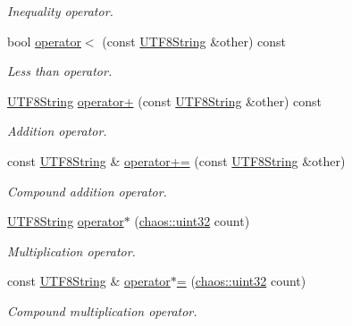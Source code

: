 \begin{DoxyCompactItemize}
\begin{DoxyCompactList}\small\item\em Inequality operator. \end{DoxyCompactList}\item 
bool \hyperlink{classchaos_1_1str_1_1_u_t_f8_string_ac7b54ed9c42a9c9a0a386d453d2c1daa}{operator$<$} (const \hyperlink{classchaos_1_1str_1_1_u_t_f8_string}{U\+T\+F8\+String} \&other) const 
\begin{DoxyCompactList}\small\item\em Less than operator. \end{DoxyCompactList}\item 
\hyperlink{classchaos_1_1str_1_1_u_t_f8_string}{U\+T\+F8\+String} \hyperlink{classchaos_1_1str_1_1_u_t_f8_string_a0d624a8e308b9a04511d31558ae37d8d}{operator+} (const \hyperlink{classchaos_1_1str_1_1_u_t_f8_string}{U\+T\+F8\+String} \&other) const 
\begin{DoxyCompactList}\small\item\em Addition operator. \end{DoxyCompactList}\item 
const \hyperlink{classchaos_1_1str_1_1_u_t_f8_string}{U\+T\+F8\+String} \& \hyperlink{classchaos_1_1str_1_1_u_t_f8_string_a9ce7f005abc581590ff3823db749873f}{operator+=} (const \hyperlink{classchaos_1_1str_1_1_u_t_f8_string}{U\+T\+F8\+String} \&other)
\begin{DoxyCompactList}\small\item\em Compound addition operator. \end{DoxyCompactList}\item 
\hyperlink{classchaos_1_1str_1_1_u_t_f8_string}{U\+T\+F8\+String} \hyperlink{classchaos_1_1str_1_1_u_t_f8_string_a8b6c57015a5e29083c74da682bc4ddac}{operator$\ast$} (\hyperlink{namespacechaos_a3b3a47ba1e284655bf1a30c441121c60}{chaos\+::uint32} count)
\begin{DoxyCompactList}\small\item\em Multiplication operator. \end{DoxyCompactList}\item 
const \hyperlink{classchaos_1_1str_1_1_u_t_f8_string}{U\+T\+F8\+String} \& \hyperlink{classchaos_1_1str_1_1_u_t_f8_string_a653dcbb095d2db19042807d03372dfbd}{operator$\ast$=} (\hyperlink{namespacechaos_a3b3a47ba1e284655bf1a30c441121c60}{chaos\+::uint32} count)
\begin{DoxyCompactList}\small\item\em Compound multiplication operator. \end{DoxyCompactList}\item 

\end{DoxyCompactItemize}
